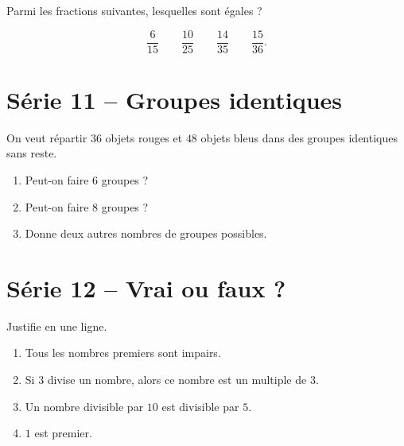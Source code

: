 \documentclass[12pt,a4paper]{article}
\begin{document}
Parmi les fractions suivantes, lesquelles sont égales ?

\[
\frac{6}{15}
\qquad
\frac{10}{25}
\qquad
\frac{14}{35}
\qquad
\frac{15}{36}.
\]

\section*{Série 11 -- Groupes identiques}

On veut répartir \(36\) objets rouges et \(48\) objets bleus
dans des groupes identiques sans reste.

\begin{enumerate}
  \item Peut-on faire \(6\) groupes ?
  \item Peut-on faire \(8\) groupes ?
  \item Donne deux autres nombres de groupes possibles.
\end{enumerate}

\section*{Série 12 -- Vrai ou faux ?}

Justifie en une ligne.

\begin{enumerate}
  \item Tous les nombres premiers sont impairs.
  \item Si \(3\) divise un nombre, alors ce nombre est un multiple de \(3\).
  \item Un nombre divisible par \(10\) est divisible par \(5\).
  \item \(1\) est premier.
\end{enumerate}
\end{document}
